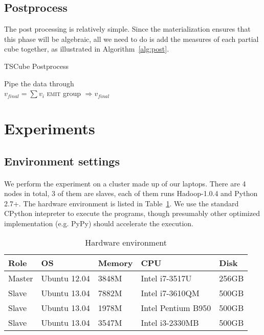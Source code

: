 \documentclass{article}
\begin{document}
\subsection{Postprocess}

The post processing is relatively simple. Since the materialization ensures that this phase will be algebraic, all we need to do is add the measures of each partial cube together, as illustrated in Algorithm~\ref{alg:post}.

\begin{algorithm}[H]
\centering
\caption{TSCube Postprocess}
\label{alg:post}
  \begin{algorithmic}[1]
      \State Pipe the data through
    \EndFunction
\\
      \State $v_{final} = \sum{v_{i}}$
      \State \textsc{emit} group $\Rightarrow v_{final}$
    \EndFunction
  \end{algorithmic}
\end{algorithm}

\section{Experiments}

\subsection{Environment settings}

\paragraph{}
We perform the experiment on a cluster made up of our laptops. There are 4 nodes in total, 3 of them are slaves, each of them runs Hadoop-1.0.4 and Python 2.7+. The hardware environment is listed in Table~\ref{table:env}. We use the standard CPython intepreter to execute the programs, though presumably other optimized implementation (e.g. PyPy) should accelerate the execution.

\begin{table}[h]
\centering
\begin{tabular}{l l l l l}
Role & OS & Memory & CPU & Disk \\
\hline
Master & Ubuntu 12.04 & 3848M & Intel i7-3517U & 256GB \\
Slave & Ubuntu 13.04  & 7882M & Intel i7-3610QM & 500GB \\
Slave & Ubuntu 13.04 & 1978M & Intel Pentium B950 & 500GB \\
Slave & Ubuntu 13.04 & 3547M & Intel i3-2330MB & 500GB
\end{tabular}

\caption{Hardware environment}
\label{table:env}
\end{table}
\end{document}
